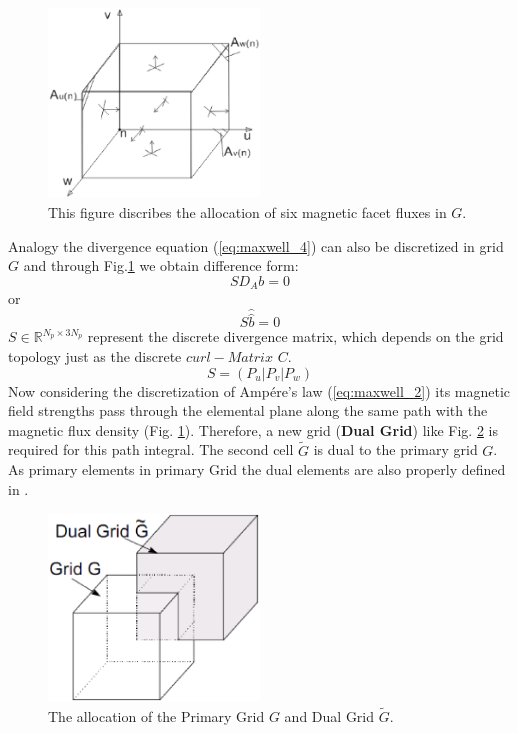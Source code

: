 \begin{figure}[!ht]
\centering
\includegraphics[width=0.5\textwidth]{bilder/divergence_in_grid}
\caption{This figure discribes the allocation of six magnetic facet fluxes in $G$.}
\label{fig:divergence_G}
\end{figure}
Analogy the divergence equation (\ref{eq:maxwell_4}) can also be discretized in grid $G$ and through Fig.\ref{fig:divergence_G} we obtain difference form: 
\begin{equation}
SD_{A}b=0
\label{eq:divergence_sample}
\end{equation}
or
\begin{equation}
S\widehat{\widehat{b}}=0
\label{eq:divergence_integral}
\end{equation}
$S\in \mathbb{R}^{N_{p}\times 3N_{p}}$ represent the discrete divergence matrix, which depends on the grid topology just as the discrete $curl-Matrix$ $C$.
\begin{equation}
S=(P_{u}|P_{v}|P_{w})
\label{eq:S_matrix}
\end{equation}
Now considering the discretization of Amp\'ere's law (\ref{eq:maxwell_2}) its magnetic field strengths pass through the elemental plane along the same path with the magnetic flux density (Fig. \ref{fig:divergence_G}). Therefore, a new grid (\textbf{Dual Grid}) like Fig. \ref{fig:dual_grid} is required for this path integral. The second cell $\tilde{G}$ is dual to the primary grid $G$. As primary elements in primary Grid the dual elements are also properly defined in \cite{script_FeldSim}.
\begin{figure}[!ht]
\centering
\includegraphics[width=0.5\textwidth]{bilder/dual_grid}
\caption{The allocation of the Primary Grid $G$ and Dual Grid $\tilde{G}$\cite{FIT_discrete_electrommagnetism}.}
\label{fig:dual_grid}
\end{figure}
